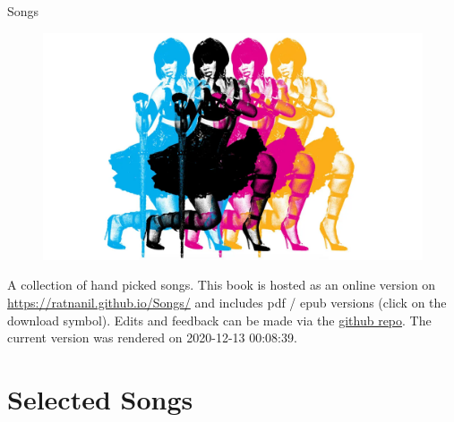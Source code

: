 \documentclass[
]{book}
\author{}
\date{\vspace{-2.5em}}
\begin{document}

\begin{titlepage}
\begin{center}
  

\end{center}
\vspace{1.5cm}
\begin{center}

{\LARGE Songs}

\end{center}
 \vspace{1cm}

\begin{figure}[htbp]
  \centering
  \includegraphics[width=1\textwidth]{misc/title.png}
  \label{titelbild}
\end{figure}

\begin{center}
\textbf{}


\end{center} 

\vspace{1.0cm}


\end{titlepage}

{
\setcounter{tocdepth}{1}
\tableofcontents
}
A collection of hand picked songs. This book is hosted as an online version on \url{https://ratnanil.github.io/Songs/} and includes pdf / epub versions (click on the download symbol). Edits and feedback can be made via the \href{https://github.com/ratnanil/songs}{github repo}. The current version was rendered on 2020-12-13 00:08:39.

\hypertarget{selected-songs}{%
\chapter{Selected Songs}\label{selected-songs}}
\end{document}
